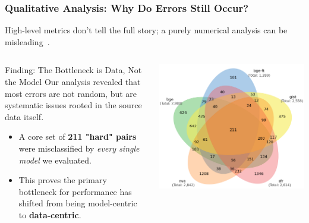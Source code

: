 \documentclass[aspectratio=169,10pt]{beamer}
\begin{document}
\begin{frame}
    \frametitle{Qualitative Analysis: Why Do Errors Still Occur?}
    
    High-level metrics don't tell the full story; a purely numerical analysis can be misleading~\cite{gauthier2022}.

    \begin{columns}[T]
        \begin{column}{0.5\textwidth}
            \begin{alertblock}{Finding: The Bottleneck is Data, Not the Model}
                Our analysis revealed that most errors are not random, but are systematic issues rooted in the source data itself.
                \begin{itemize}
                    \item A core set of \textbf{211 "hard" pairs} were misclassified by \textit{every single model} we evaluated.
                    \vspace{1em}
                    \item This proves the primary bottleneck for performance has shifted from being model-centric to \textbf{data-centric}.
                \end{itemize}
            \end{alertblock}
        \end{column}
        
        \begin{column}{0.45\textwidth}
            
            \centering
            \includegraphics[width=\textwidth]{venn_with_totals_evaldata.png} %
            

\end{column}
\end{columns}
\end{frame}
\end{document}
